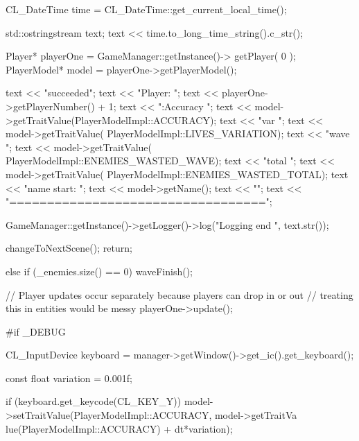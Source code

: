 \begin{DoxyCode}
{{{                        CL_DateTime time = CL_DateTime::get_current_local_time();
      
                        std::ostringstream text;
                        text << time.to_long_time_string().c_str();

                        Player* playerOne = GameManager::getInstance()->
      getPlayer( 0 );
                        PlayerModel* model = playerOne->getPlayerModel();

                        text << "\nPlayer succeeded\n\n ";
                        text << "Player: ";
                        text << playerOne->getPlayerNumber() + 1;
                        text << "\nStats:\n Accuracy ";
                        text << model->getTraitValue(PlayerModelImpl::ACCURACY);
                        text << "\tLives var ";
                        text << model->getTraitValue(
      PlayerModelImpl::LIVES_VARIATION);
                        text << "\tEnemies wave ";
                        text << model->getTraitValue(
      PlayerModelImpl::ENEMIES_WASTED_WAVE);
                        text << "\tEnemies total ";
                        text << model->getTraitValue(
      PlayerModelImpl::ENEMIES_WASTED_TOTAL);
                        text << "\nModel name start: ";
                        text << model->getName();
                        text << "\n";
                        text << "==================================\n";

                        GameManager::getInstance()->getLogger()->log("Logging end
      ", text.str());

                        changeToNextScene();
                        return;
                }
        }
        else
        {
                if (_enemies.size() == 0)
                {
                        waveFinish();
                }
        }

        // Player updates occur separately because players can drop in or out
        // treating this in entities would be messy
        playerOne->update();

#if _DEBUG

        CL_InputDevice keyboard = manager->getWindow()->get_ic().get_keyboard();

        const float variation = 0.001f;

        if (keyboard.get_keycode(CL_KEY_Y))
        {
                model->setTraitValue(PlayerModelImpl::ACCURACY, model->getTraitVa
      lue(PlayerModelImpl::ACCURACY) + dt*variation);
        }

}
\end{DoxyCode}
